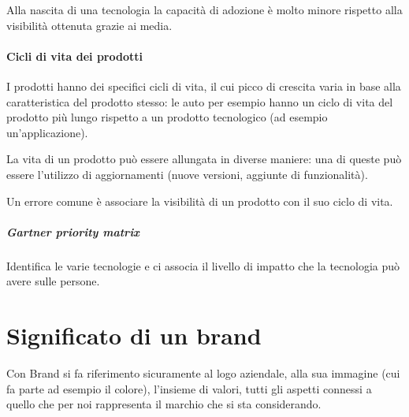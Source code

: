 Alla nascita di una tecnologia la capacità di adozione è molto minore rispetto
alla visibilità ottenuta grazie ai media.

\paragraph*{Cicli di vita dei prodotti} I prodotti hanno dei specifici cicli di
vita, il cui picco di crescita varia in base alla caratteristica del prodotto
stesso: le auto per esempio hanno un ciclo di vita del prodotto più lungo
rispetto a un prodotto tecnologico (ad esempio un'applicazione).

La vita di un prodotto può essere allungata in diverse maniere:
una di queste può essere l'utilizzo di aggiornamenti (nuove versioni,
aggiunte di funzionalità).

Un errore comune è associare la visibilità di un prodotto con il suo ciclo di
vita.

\subparagraph*{Gartner priority matrix} Identifica le varie tecnologie e ci
associa il livello di impatto che la tecnologia può avere sulle persone.

\section{Significato di un brand}

Con Brand si fa riferimento sicuramente al logo aziendale, alla sua immagine
(cui fa parte ad esempio il colore), l'insieme di valori, tutti gli aspetti
connessi a quello che per noi rappresenta il marchio che si sta considerando.

